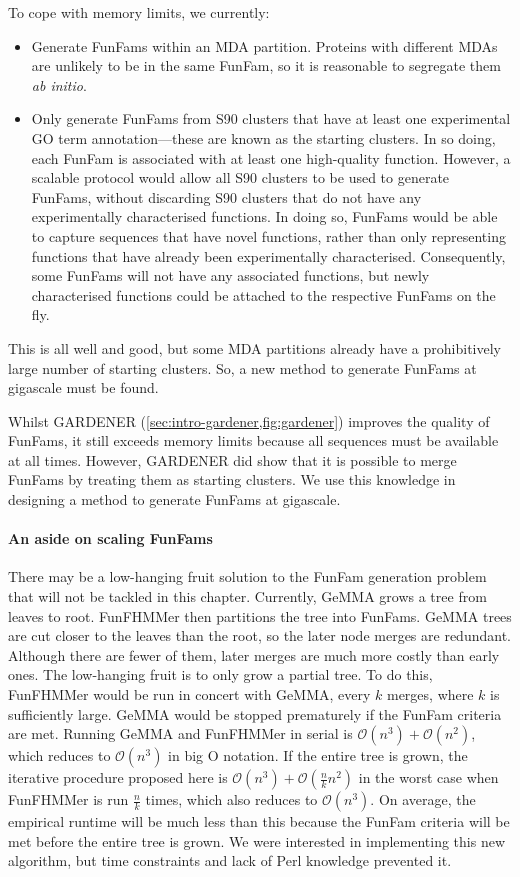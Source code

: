 To cope with memory limits, we currently:

\begin{itemize}
\item
  Generate FunFams within an MDA partition. Proteins with different MDAs are unlikely to be in the same FunFam, so it is reasonable to segregate them \emph{ab initio}.
\item
  Only generate FunFams from S90 clusters that have at least one experimental GO term annotation---these are known as the starting clusters. In so doing, each FunFam is associated with at least one high-quality function. However, a scalable protocol would allow all S90 clusters to be used to generate FunFams, without discarding S90 clusters that do not have any experimentally characterised functions. In doing so, FunFams would be able to capture sequences that have novel functions, rather than only representing functions that have already been experimentally characterised. Consequently, some FunFams will not have any associated functions, but newly characterised functions could be attached to the respective FunFams on the fly.
\end{itemize}

This is all well and good, but some MDA partitions already have a prohibitively large number of starting clusters. So, a new method to generate FunFams at gigascale must be found.

Whilst GARDENER (\ref{sec:intro-gardener,fig:gardener}) improves the quality of FunFams, it still exceeds memory limits because all sequences must be available at all times. However, GARDENER did show that it is possible to merge FunFams by treating them as starting clusters. We use this knowledge in designing a method to generate FunFams at gigascale.

\paragraph{An aside on scaling FunFams}
There may be a low-hanging fruit solution to the FunFam generation problem that will not be tackled in this chapter. Currently, GeMMA grows a tree from leaves to root. FunFHMMer then partitions the tree into FunFams. GeMMA trees are cut closer to the leaves than the root, so the later node merges are redundant. Although there are fewer of them, later merges are much more costly than early ones. The low-hanging fruit is to only grow a partial tree. To do this, FunFHMMer would be run in concert with GeMMA, every $k$ merges, where $k$ is sufficiently large. GeMMA would be stopped prematurely if the FunFam criteria are met. Running GeMMA and FunFHMMer in serial is $\mathcal{O}(n^3)+\mathcal{O}(n^2)$, which reduces to $\mathcal{O}(n^3)$ in big O notation. If the entire tree is grown, the iterative procedure proposed here is $\mathcal{O}(n^3) + \mathcal{O}(\frac{n}{k}n^2)$ in the worst case when FunFHMMer is run $\frac{n}{k}$ times, which also reduces to $\mathcal{O}(n^3)$. On average, the empirical runtime will be much less than this because the FunFam criteria will be met before the entire tree is grown. We were interested in implementing this new algorithm, but time constraints and lack of Perl knowledge prevented it.

